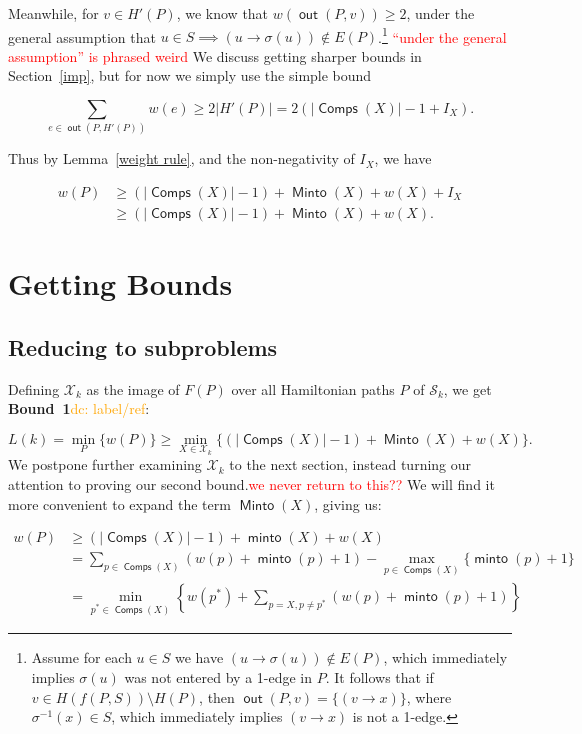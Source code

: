 \documentclass{article}
\theoremstyle{definition}
\DeclareMathOperator{\minto}{\bm{\mathsf{minto}}}
\DeclareMathOperator{\Minto}{\bm{\mathsf{Minto}}}
\DeclareMathOperator{\out}{\bm{\mathsf{out}}}
\DeclareMathOperator{\Comp}{\bm{\mathsf{Comps}}}
\newcommand{\edit}[1]{\textcolor{red}{#1}}
\newcommand{\dc}[1]{\textcolor{orange}{dc: #1}}
\begin{document}
Meanwhile, for $v \in H'(P)$, we know that $w(\out(P,v)) \geq 2$, under the general assumption that $u\in S\implies (u\to \sigma(u)) \not\in E(P)$.\footnote{Assume for each $u \in S$ we have $(u \to \sigma(u)) \not \in E(P)$, which immediately implies $\sigma(u)$ was not entered by a 1-edge in $P$. It follows that if $v \in H(f(P,S))\setminus H(P) $, then $\out(P,v) =\{(v\to x)\}$, where $\sigma^{-1}(x) \in S$, which immediately implies $(v\to x)$ is not a 1-edge.}\edit{ ``under the general assumption'' is phrased weird} We discuss getting sharper bounds in Section~\ref{imp}, but for now we simply use the simple bound

\[\sum_{e \in \out(P,H'(P))} w(e) \geq 2|H'(P)| = 2(|\Comp(X)|-1+I_X). \]



\vspace{1.75em}

Thus by Lemma~\ref{weight rule}, and the non-negativity of $I_X$, we have

\begin{align*} w(P) &\geq (|\Comp(X)|-1)+\Minto(X)+w(X)+I_X\\
&\geq (|\Comp(X)|-1)+\Minto(X)+w(X).\end{align*}

\section{Getting Bounds} \label{reductions}

\subsection{Reducing to subproblems} \label{to subproblems}

Defining $\mathcal{X}_k$ as the image of $F(P)$ over all Hamiltonian paths $P$ of $\mathcal{S}_k$, we get \textbf{Bound~1}\dc{ label/ref}:

\[L(k) = \min_{P} \{w(P)\} \geq \min_{X \in \mathcal{X}_k} \{(|\Comp(X)|-1) + \Minto(X) + w(X)\}.\]
We postpone further examining $\mathcal{X}_k$ to the next section, instead turning our attention to proving our second bound.\edit{we never return to this??} We will find it more convenient to expand the term $\Minto(X)$, giving us:

\begin{align*}
    w(P) &\geq (|\Comp(X)|-1) + \minto(X) + w(X) \\
    &= \sum_{p \in \Comp(X)} (w(p)+\minto(p)+1) - \max_{p \in \Comp(X)}\{\minto(p)+1\} \\
    &= \min_{p^* \in \Comp(X)}\left\{w(p^*) + \sum_{p = X, p \neq p^*} (w(p)+\minto(p)+1)\right\}
\end{align*}
\end{document}
